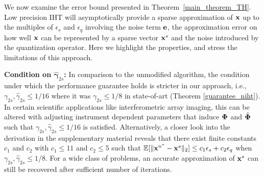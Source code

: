 \documentclass{article}
\begin{document}
We now examine the error bound presented in Theorem~\ref{main_theorem_TH}. Low precision IHT will asymptotically provide a sparse approximation of ${\bf x}$ up to the multiples of $ {\epsilon}_s$ and $ {\epsilon}_q$ involving the noise term ${\bf e}$, the approximation error on how well ${\bf x}$ can be represented by a sparse vector ${\bf x}^s$ and the noise introduced by the quantization operator. 
Here we highlight the properties, and stress the limitations of this approach.

{\bf Condition on $\hat{\boldsymbol{\gamma}}_{2s}$:} In comparison to the unmodified algorithm, the condition under which the performance guarantee holds is stricter in our approach, i.e., ${\gamma}_{2s}, \hat{\gamma}_{2s}\leq 1/16$ where it was ${\gamma}_{2s}\leq 1/8$ in state-of-art (Theorem \ref{guarantee_niht}). In certain scientific applications like interferometric array imaging, this can be altered with adjusting instrument dependent parameters that induce ${\bf \Phi}$ and $\hat{\bf \Phi}$ such that ${\gamma}_{2s}, \hat{\gamma}_{2s}\leq 1/16$ is satisfied. Alternatively, a closer look into the derivation in the supplementary material reveals that there exist finite constants $c_1$ and $c_2$ with $c_1\leq 11$ and $c_2\leq 5$ such that $\mathbb{E}[\|{\bf x}^{n^*}-{\bf x}^s \|_2] \leq c_1\epsilon_s + c_2\epsilon_q$ when ${\gamma}_{2s}, \hat{\gamma}_{2s}\leq 1/8$. For a wide class of problems, an accurate approximation of ${\bf x}^s$ can still be recovered after sufficient number of iterations.
\end{document}
